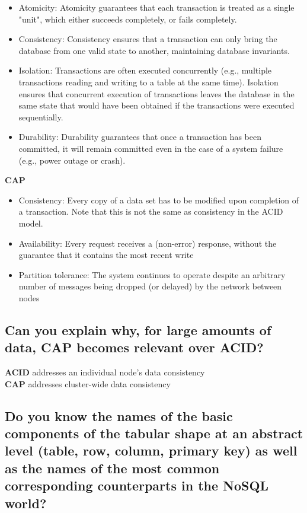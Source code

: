 \documentclass{article}
\begin{document}
\begin{itemize}
    \item Atomicity: Atomicity guarantees that each transaction is treated as a single "unit", which either succeeds completely, or fails completely.
    \item Consistency: Consistency ensures that a transaction can only bring the database from one valid state to another, maintaining database invariants.
    \item Isolation: Transactions are often executed concurrently (e.g., multiple transactions reading and writing to a table at the same time). Isolation ensures that concurrent execution of transactions leaves the database in the same state that would have been obtained if the transactions were executed sequentially.
    \item Durability: Durability guarantees that once a transaction has been committed, it will remain committed even in the case of a system failure (e.g., power outage or crash).
\end{itemize}

\noindent\textbf{CAP}

\begin{itemize}
    \item Consistency: Every copy of a data set has to be modified upon completion of a transaction. Note that this is not the same as consistency in the ACID model.
    \item Availability: Every request receives a (non-error) response, without the guarantee that it contains the most recent write
    \item Partition tolerance: The system continues to operate despite an arbitrary number of messages being dropped (or delayed) by the network between nodes
\end{itemize}

\subsection{Can you explain why, for large amounts of data, CAP becomes relevant over ACID?}

\noindent\textbf{ACID} addresses an individual node's data consistency\\
\textbf{CAP} addresses cluster-wide data consistency

\subsection{Do you know the names of the basic components of the tabular shape at an abstract level (table, row, column, primary key) as well as the names of the most common corresponding counterparts in the NoSQL world?}
\end{document}
